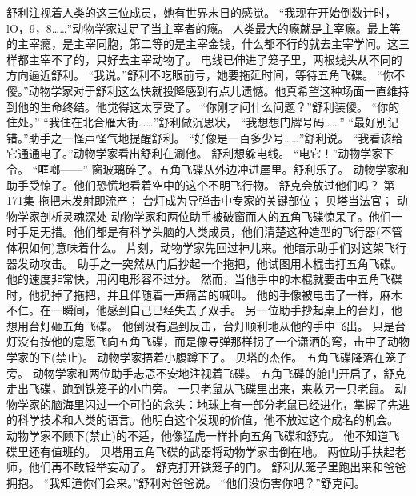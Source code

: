\documentclass[a4paper,12pt,UTF8,twoside]{ctexbook}
\begin{document}
        舒利注视着人类的这三位成员，她有世界末日的感觉。 
        “我现在开始倒数计时，lO，9，8……”动物学家过足了当主宰者的瘾。 
        人类最大的瘾就是主宰瘾。最上等的主宰瘾，是主宰同胞，第二等的是主宰金钱，什么都不行的就去主宰学问。这三样都主宰不了的，只好去主宰动物了。 
        电线已伸进了笼子里，两根线头从不同的方向逼近舒利。 
        “我说。”舒利不吃眼前亏，她要拖延时间，等待五角飞碟。 
        “你不傻。”动物学家对于舒利这么快就投降感到有点儿遗憾。他真希望这种场面一直维持到他的生命终结。他觉得这太享受了。 
        “你刚才问什么问题？”舒利装傻。 
        “你的住处。” 
        “我住在北合雁大街……”舒利做沉思状，  “我想想门牌号码……” 
        “最好别记错。”助手之一怪声怪气地提醒舒利。 
        “好像是一百多少号……”舒利说。 
        “我看该给它通通电了。”动物学家看出舒利在涮他。 
        舒利想躲电线。 
        “电它！”动物学家下令。 
        “哐啷——” 
        窗玻璃碎了。五角飞碟从外边冲进屋里。舒利乐了。 
        动物学家和助手受惊了。他们恐慌地看着空中的这个不明飞行物。 
        舒克会放过他们吗？   第171集 
        拖把未发射即流产； 
        台灯成为导弹击中专家的关键部位； 
        贝塔当法官； 
        动物学家剖析灵魂深处   
        动物学家和两位助手被破窗而人的五角飞碟惊呆了。他们一时手足无措。他们都是有科学头脑的人类成员，他们清楚这种造型的飞行器(不管体积如何)意味着什么。 
        片刻，动物学家先回过神儿来。他暗示助手们对这架飞行器发动攻击。 
        助手之一突然从门后抄起一个拖把，他试图用木棍击打五角飞碟。 
        他的速度非常快，用闪电形容不过分。 
        然而，当他手中的木棍就要击中五角飞碟时，他扔掉了拖把，并且伴随着一声痛苦的喊叫。 
        他的手像被电击了一样，麻木不仁。在一瞬间，他感到自己已经失去了双手。 
        另一位助手抄起桌上的台灯，他想用台灯砸五角飞碟。 
        他倒没有遇到反击，台灯顺利地从他的手中飞出。 
        只是台灯没有按他的意愿飞向五角飞碟，而是像导弹那样拐了一个潇洒的弯，击中了动物学家的下(禁止)。 
        动物学家捂着小腹蹲下了。 
        贝塔的杰作。 
        五角飞碟降落在笼子旁。 
        动物学家和两位助手忐忑不安地注视着飞碟。 
        五角飞碟的舱门开启了，舒克走出飞碟，跑到铁笼子的小门旁。 
        一只老鼠从飞碟里出来，来救另一只老鼠。 
        动物学家的脑海里闪过一个可怕的念头：地球上有一部分老鼠已经进化，掌握了先进的科学技术和人类的语言。他明白这个发现的价值，他不放过这个成名的机会。 
        动物学家不顾下(禁止)的不适，他像猛虎一样扑向五角飞碟和舒克。 
        他不知道飞碟里还有值班的。 
        贝塔用五角飞碟的武器将动物学家击倒在地。 
        两位助手扶起老师，他们再不敢轻举妄动了。 
        舒克打开铁笼子的门。 
        舒利从笼子里跑出来和爸爸拥抱。 
        “我知道你们会来。”舒利对爸爸说。 
        “他们没伤害你吧？”舒克问。 
\end{document}
